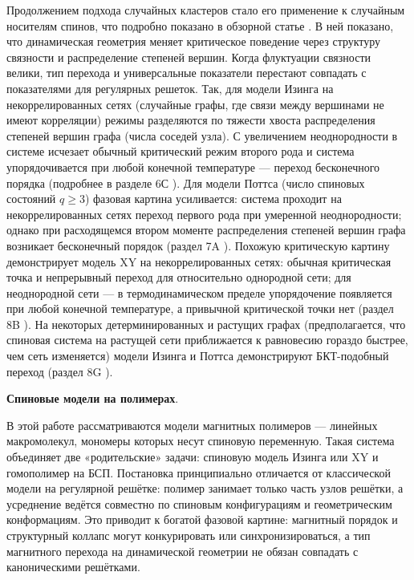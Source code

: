   Продолжением  подхода случайных кластеров стало его применение к случайным носителям спинов, что подробно показано в  обзорной статье \cite{RevModPhys.80.1275}. 
  В ней показано, что динамическая геометрия меняет критическое поведение через структуру связности и распределение степеней вершин. Когда флуктуации связности велики, тип перехода и универсальные показатели перестают совпадать с показателями для регулярных решеток.
  Так, для модели Изинга на некоррелированных сетях (случайные графы, где связи между вершинами не имеют корреляции) режимы разделяются по тяжести хвоста распределения степеней вершин графа (числа соседей узла).  
  С увеличением неоднородности в системе исчезает обычный критический режим второго рода и система упорядочивается  при любой конечной температуре --- переход бесконечного порядка (подробнее в разделе 6С \cite{RevModPhys.80.1275}).
  Для модели Поттса (число спиновых состояний $q \ge 3$) фазовая картина усиливается:  система проходит на некоррелированных сетях переход первого рода  при умеренной неоднородности; однако при расходящемся втором моменте распределения степеней  вершин графа возникает бесконечный порядок (раздел 7A  \cite{RevModPhys.80.1275}). 
Похожую критическую картину демонстрирует модель XY на некоррелированных сетях: обычная критическая точка и непрерывный переход для относительно однородной сети; для неоднородной сети --- в термодинамическом пределе упорядочение появляется при любой конечной температуре, а привычной критической точки нет (раздел 8B   \cite{RevModPhys.80.1275}). 
  На некоторых детерминированных и растущих графах (предполагается, что спиновая система на растущей сети приближается к равновесию гораздо быстрее, чем сеть изменяется) модели Изинга и Поттса демонстрируют БКТ-подобный переход  (раздел 8G   \cite{RevModPhys.80.1275}). 
  
  

  
  
  \textbf{Спиновые модели на полимерах}.
   
  В этой работе рассматриваются модели магнитных полимеров --- линейных макромолекул, мономеры которых несут спиновую переменную.
  Такая система объединяет две «родительские» задачи: спиновую модель Изинга или XY и гомополимер на БСП. 
  Постановка принципиально отличается от классической модели на регулярной решётке: полимер занимает только часть узлов решётки, а усреднение ведётся совместно по спиновым конфигурациям и геометрическим конформациям.  
  Это приводит к богатой фазовой картине: магнитный порядок и структурный коллапс могут конкурировать или синхронизироваться, а тип магнитного перехода на динамической геометрии не обязан совпадать с каноническими решётками. 
  
